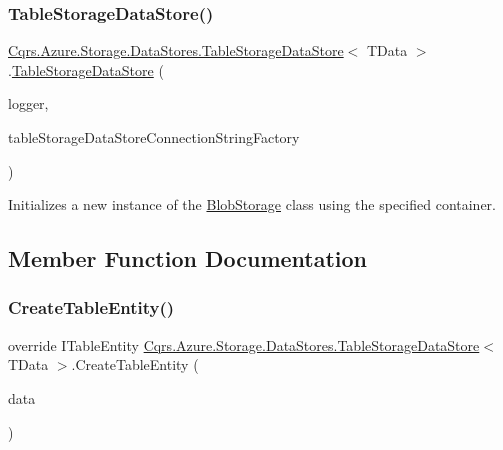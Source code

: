 \subsubsection{\texorpdfstring{Table\+Storage\+Data\+Store()}{TableStorageDataStore()}}
{\footnotesize\ttfamily \hyperlink{classCqrs_1_1Azure_1_1Storage_1_1DataStores_1_1TableStorageDataStore}{Cqrs.\+Azure.\+Storage.\+Data\+Stores.\+Table\+Storage\+Data\+Store}$<$ T\+Data $>$.\hyperlink{classCqrs_1_1Azure_1_1Storage_1_1DataStores_1_1TableStorageDataStore}{Table\+Storage\+Data\+Store} (\begin{DoxyParamCaption}\item[{I\+Logger}]{logger,  }\item[{\hyperlink{interfaceCqrs_1_1Azure_1_1BlobStorage_1_1DataStores_1_1ITableStorageDataStoreConnectionStringFactory}{I\+Table\+Storage\+Data\+Store\+Connection\+String\+Factory}}]{table\+Storage\+Data\+Store\+Connection\+String\+Factory }\end{DoxyParamCaption})}



Initializes a new instance of the \hyperlink{namespaceCqrs_1_1Azure_1_1BlobStorage}{Blob\+Storage} class using the specified container. 



\subsection{Member Function Documentation}
\mbox{\label{classCqrs_1_1Azure_1_1Storage_1_1DataStores_1_1TableStorageDataStore_abf8e295af6e0925f1c9c3550b931a4a8}} 
\subsubsection{\texorpdfstring{Create\+Table\+Entity()}{CreateTableEntity()}}
{\footnotesize\ttfamily override I\+Table\+Entity \hyperlink{classCqrs_1_1Azure_1_1Storage_1_1DataStores_1_1TableStorageDataStore}{Cqrs.\+Azure.\+Storage.\+Data\+Stores.\+Table\+Storage\+Data\+Store}$<$ T\+Data $>$.Create\+Table\+Entity (\begin{DoxyParamCaption}\item[{T\+Data}]{data }\end{DoxyParamCaption})\hspace{0.3cm}{\ttfamily [protected]}}


